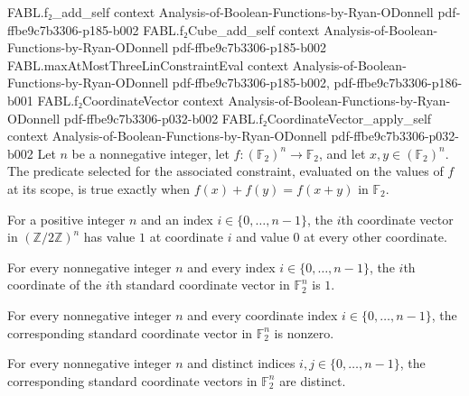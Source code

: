 \begin{theorem}
\proofstep
  {FABL.f₂_add_self}
  {context}
  {Analysis-of-Boolean-Functions-by-Ryan-ODonnell}
  {pdf-ffbe9c7b3306-p185-b002}
\proofstep
  {FABL.f₂Cube_add_self}
  {context}
  {Analysis-of-Boolean-Functions-by-Ryan-ODonnell}
  {pdf-ffbe9c7b3306-p185-b002}
\proofstep
  {FABL.maxAtMostThreeLinConstraintEval}
  {context}
  {Analysis-of-Boolean-Functions-by-Ryan-ODonnell}
  {pdf-ffbe9c7b3306-p185-b002,
    pdf-ffbe9c7b3306-p186-b001}
\proofstep
  {FABL.f₂CoordinateVector}
  {context}
  {Analysis-of-Boolean-Functions-by-Ryan-ODonnell}
  {pdf-ffbe9c7b3306-p032-b002}
\proofstep
  {FABL.f₂CoordinateVector_apply_self}
  {context}
  {Analysis-of-Boolean-Functions-by-Ryan-ODonnell}
  {pdf-ffbe9c7b3306-p032-b002}
Let $n$ be a nonnegative integer, let $f:(\mathbb F_2)^n\to\mathbb F_2$, and let
$x,y\in(\mathbb F_2)^n$. The predicate selected for the associated constraint, evaluated
on the values of $f$ at its scope, is true exactly when $f(x)+f(y)=f(x+y)$ in $\mathbb
F_2$.
\end{theorem}

\begin{definition}
\leanok
{}
For a positive integer $n$ and an index $i\in\{0,\ldots,n-1\}$, the $i$th coordinate
vector in $(\mathbb{Z}/2\mathbb{Z})^n$ has value $1$ at coordinate $i$ and value $0$ at
every other coordinate.
\end{definition}

\begin{theorem}
\leanok
{}
For every nonnegative integer $n$ and every index $i\in\{0,\ldots,n-1\}$, the $i$th
coordinate of the $i$th standard coordinate vector in $\mathbb{F}_2^n$ is $1$.
\end{theorem}

\begin{theorem}
\leanok
{}
For every nonnegative integer $n$ and every coordinate index $i\in\{0,\ldots,n-1\}$, the
corresponding standard coordinate vector in $\mathbb{F}_2^n$ is nonzero.
\end{theorem}

\begin{theorem}
\leanok
{}
For every nonnegative integer $n$ and distinct indices $i,j\in\{0,\ldots,n-1\}$, the
corresponding standard coordinate vectors in $\mathbb{F}_2^n$ are distinct.
\end{theorem}

